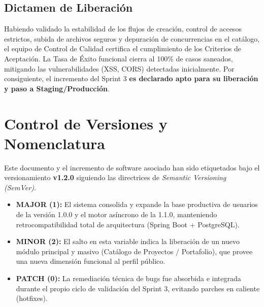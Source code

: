 \subsection{Dictamen de Liberación}
\begin{tcolorbox}[colback=white, colframe=bgPass, boxrule=1.2pt, arc=2pt, title={\faCheckCircle\ \textbf{DICTAMEN: SPRINT EXITOSO Y CATÁLOGO APROBADO}}, coltitle=bgPass, fonttitle=\sffamily, attach title to upper=\par\vspace{0.2em}]
\sffamily
Habiendo validado la estabilidad de los flujos de creación, control de accesos estrictos, subida de archivos seguros y depuración de concurrencias en el catálogo, el equipo de Control de Calidad certifica el cumplimiento de los Criterios de Aceptación. La Tasa de Éxito funcional cierra al 100\% de casos saneados, mitigando las vulnerabilidades (XSS, CORS) detectadas inicialmente. Por consiguiente, el incremento del Sprint 3 \textbf{es declarado apto para su liberación y paso a Staging/Producción}.
\end{tcolorbox}

\section{Control de Versiones y Nomenclatura}
\label{sec:versioning_sp3}

Este documento y el incremento de software asociado han sido etiquetados bajo el versionamiento \textbf{v1.2.0} siguiendo las directrices de \textit{Semantic Versioning (SemVer)}.

\begin{itemize}[noitemsep]
    \item \textbf{MAJOR (1):} El sistema consolida y expande la base productiva de usuarios de la versión 1.0.0 y el motor asíncrono de la 1.1.0, manteniendo retrocompatibilidad total de arquitectura (Spring Boot + PostgreSQL).
    \item \textbf{MINOR (2):} El salto en esta variable indica la liberación de un nuevo módulo principal y masivo (Catálogo de Proyectos / Portafolio), que provee una nueva dimensión funcional al perfil público.
    \item \textbf{PATCH (0):} La remediación técnica de bugs fue absorbida e integrada durante el propio ciclo de validación del Sprint 3, evitando parches en caliente (hotfixes).
\end{itemize}
